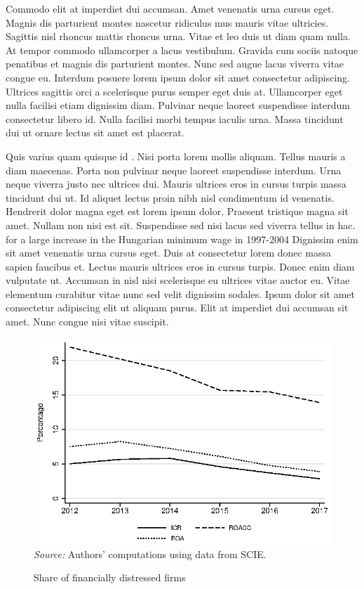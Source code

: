 \documentclass[12pt]{article}
\begin{document}
Commodo elit at imperdiet dui accumsan. Amet venenatis urna cursus eget. Magnis dis parturient montes nascetur ridiculus mus mauris vitae ultricies. Sagittis nisl rhoncus mattis rhoncus urna. Vitae et leo duis ut diam quam nulla. At tempor commodo ullamcorper a lacus vestibulum. Gravida cum sociis natoque penatibus et magnis dis parturient montes. Nunc sed augue lacus viverra vitae congue eu. Interdum posuere lorem ipsum dolor sit amet consectetur adipiscing. Ultrices sagittis orci a scelerisque purus semper eget duis at. Ullamcorper eget nulla facilisi etiam dignissim diam. Pulvinar neque laoreet suspendisse interdum consectetur libero id. Nulla facilisi morbi tempus iaculis urna. Massa tincidunt dui ut ornare lectus sit amet est placerat.

Quis varius quam quisque id \cite{draca2011minimum}. Nisi porta lorem mollis aliquam. Tellus mauris a diam maecenas. Porta non pulvinar neque laoreet suspendisse interdum. Urna neque viverra justo nec ultrices dui. Mauris ultrices eros in cursus turpis massa tincidunt dui ut. Id aliquet lectus proin nibh nisl condimentum id venenatis. Hendrerit dolor magna eget est lorem ipsum dolor. Praesent tristique magna sit amet. Nullam non nisi est sit. Suspendisse sed nisi lacus sed viverra tellus in hac. \cite{harasztosi2019pays} for a large increase in the Hungarian minimum wage in 1997-2004 Dignissim enim sit amet venenatis urna cursus eget. Duis at consectetur lorem donec massa sapien faucibus et. Lectus mauris ultrices eros in cursus turpis. Donec enim diam vulputate ut. Accumsan in nisl nisi scelerisque eu ultrices vitae auctor eu. Vitae elementum curabitur vitae nunc sed velit dignissim sodales. Ipsum dolor sit amet consectetur adipiscing elit ut aliquam purus. Elit at imperdiet dui accumsan sit amet. Nunc congue nisi vitae suscipit.




\begin{figure}[ht]
\begin{minipage}{.75\linewidth}
\caption{Share of financially distressed firms}\label{fig:FDF}
\includegraphics[width=\linewidth]{figures/share_zombies.eps}
\footnotesize
\emph{Source:} Authors' computations using data from SCIE.
\end{minipage}{}
\end{figure}
\end{document}
